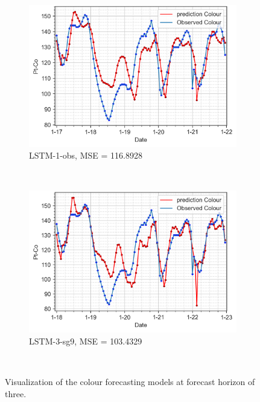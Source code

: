 \begin{figure}[!ht]
  \centering
  \begin{subfigure}[t]{0.7\textwidth}
    \includegraphics[width=\linewidth]{imgs/results/steps/colour-lstm-1-fc3.png}
    \caption{LSTM-1-obs, MSE = 116.8928} \label{fig:colour-lstm-1-fc3}
  \end{subfigure}\\
  \vspace{1em}
  \begin{subfigure}[t]{0.7\textwidth}
    \includegraphics[width=\linewidth]{imgs/results/steps/colour-lstm-3-fc3.png}
    \caption{LSTM-3-sg9, MSE = 103.4329} \label{fig:colour-lstm-3-fc3}
  \end{subfigure}\\
\caption{Visualization of the colour forecasting models at forecast horizon of three.} \label{fig:colour-forecast-fc3}
\end{figure}
